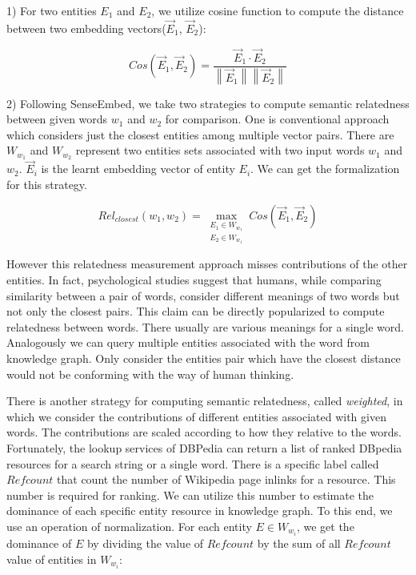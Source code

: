 1) For two entities $E_1$ and $E_2$, we utilize cosine function to compute the
distance between two embedding vectors($\overrightarrow E_1$, $\overrightarrow E_2$):

\begin{small}
    \begin{equation}
        \label{cos}
        \nonumber
        Cos(\overrightarrow E_1,\overrightarrow E_2) = \frac{\overrightarrow E_1 \cdot 
        \overrightarrow E_2}{\left \| \overrightarrow E_1 \right \|\left \| \overrightarrow E_2 \right \|}
    \end{equation}
\end{small}

2) Following SenseEmbed, we take two strategies to compute semantic relatedness between given
words $w_1$ and $w_2$ for comparison. One is conventional approach \cite{BudanitskyH06} which considers just the closest entities
among multiple vector pairs. There are $W_{w_1}$ and $W_{w_2}$ represent two entities sets associated with two
input words $w_1$ and $w_2$. $\overrightarrow E_i$ is the learnt embedding vector of entity $E_i$. We can get the
formalization for this strategy.

\begin{small}
    \begin{equation}
        \label{cos}
        \nonumber
        Rel_{closest}(w_1, w_2) = \max \limits_{\substack{E_1 \in W_{w_1} \\ E_2 \in W_{w_1}}}
        Cos(\overrightarrow E_1,\overrightarrow E_2)
    \end{equation}
\end{small}
However this relatedness measurement approach misses contributions of the other entities.
In fact, psychological studies suggest that humans, while comparing similarity between a pair of words, consider
different meanings of two words but not only the closest pairs\cite{Tversky77}. This claim can be directly popularized to compute
relatedness between words. There usually are various meanings for a single word. Analogously we can query multiple
entities associated with the word from knowledge graph. Only consider the entities pair which have the closest distance
would not be conforming with the way of human thinking.

There is another strategy for computing semantic relatedness, called \emph{weighted}, in which
we consider the contributions of different entities associated with given words. The contributions are
scaled according to how they relative to the words. Fortunately, the lookup services of DBPedia can
return a list of ranked DBpedia resources for a search string or a single word. There is a specific label called
$Refcount$ that count the number of Wikipedia page inlinks for a resource. This number is required for ranking.
We can utilize this number to estimate the dominance of each specific entity resource in knowledge graph.
To this end, we use an operation of normalization. For each entity $E \in W_{w_i}$, we get the dominance of
$E$ by dividing the value of $Refcount$ by the sum of all $Refcount$ value of entities in  $W_{w_i}$:

